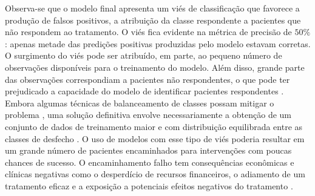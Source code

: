Observa-se que o modelo final apresenta um viés de classificação que favorece a produção de falsos positivos, a atribuição da classe respondente a pacientes que não respondem ao tratamento. O viés fica evidente
na métrica de precisão de $50\%$: apenas metade das predições positivas produzidas pelo modelo estavam corretas. O surgimento do viés pode ser atribuído, em parte, ao pequeno número de observações disponíveis para
o treinamento do modelo. Além disso, grande parte das observações correspondiam a pacientes não respondentes, o que pode ter prejudicado a capacidade do modelo de identificar pacientes respondentes \cite{Delgadillo2020}.
Embora algumas técnicas de balanceamento de classes possam mitigar o problema \cite{Bi2019}, uma solução definitiva envolve necessariamente a obtenção de um conjunto de dados de treinamento maior e com distribuição
equilibrada entre as classes de desfecho \cite{Delgadillo2020}. O uso de modelos com esse tipo de viés poderia resultar em um grande número de pacientes encaminhados para intervenções com poucas chances de sucesso. O
encaminhamento falho tem consequências econômicas e clínicas negativas como o desperdício de recursos financeiros, o adiamento de um tratamento eficaz e a exposição a potenciais efeitos negativos do tratamento \cite{John2009}. 
